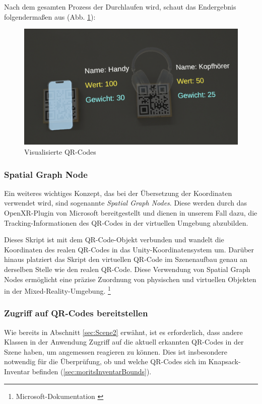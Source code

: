 \begin{itemize}
Nach dem gesamten Prozess der Durchlaufen wird, schaut das Endergebnis folgendermaßen aus (Abb. \ref{fig:visqr}):

\begin{figure}[H]
    \centering
    \includegraphics[scale=0.15, angle=0]{images/scanned}
    \caption{Visualisierte QR-Codes}
    \label{fig:visqr}
\end{figure}

\subsubsection{\label{sec:SGN} Spatial Graph Node}
Ein weiteres wichtiges Konzept, das bei der Übersetzung der Koordinaten verwendet wird, sind sogenannte \textit{Spatial Graph Nodes}. Diese werden durch das OpenXR-Plugin von Microsoft bereitgestellt und dienen in unserem Fall dazu, die Tracking-Informationen des QR-Codes in der virtuellen Umgebung abzubilden.

Dieses Skript ist mit dem QR-Code-Objekt verbunden und wandelt die Koordinaten des realen QR-Codes in das Unity-Koordinatensystem um. Darüber hinaus platziert das Skript den virtuellen QR-Code im Szenenaufbau genau an derselben Stelle wie den realen QR-Code. Diese Verwendung von Spatial Graph Nodes ermöglicht eine präzise Zuordnung von physischen und virtuellen Objekten in
der Mixed-Reality-Umgebung. \footnote{Microsoft-Dokumentation \cite{Spatial Graph Node}}


\subsubsection{Zugriff auf QR-Codes bereitstellen}
Wie bereits in Abschnitt \ref{sec:Scene2} erwähnt, ist es erforderlich, dass andere Klassen in der Anwendung Zugriff auf die aktuell erkannten QR-Codes in der Szene haben, um angemessen reagieren zu können. Dies ist insbesondere notwendig für die Überprüfung, ob und welche QR-Codes sich im Knapsack-Inventar befinden (\ref{sec:moritsInventarBounds}).


\end{itemize}
